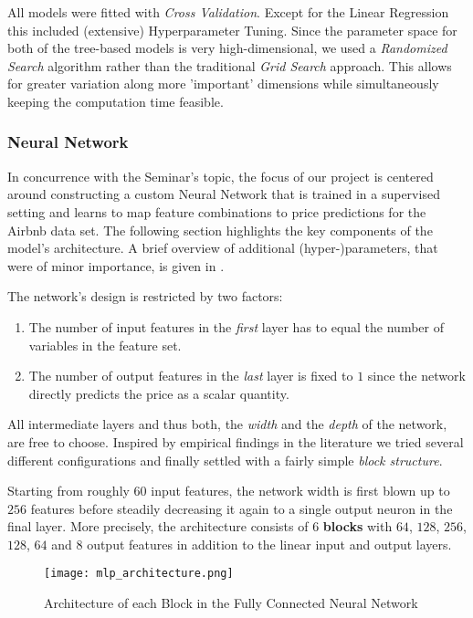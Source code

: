 All models were fitted with \emph{Cross Validation}.
Except for the Linear Regression this included (extensive) Hyperparameter Tuning.
Since the parameter space for both of the tree-based models is very high-dimensional, we used a \emph{Randomized Search} algorithm \citep{bergstra2012} rather than the traditional \emph{Grid Search} approach.
This allows for greater variation along more 'important' dimensions while simultaneously keeping the computation time feasible.


\subsubsection{Neural Network} \label{neural-network}

In concurrence with the Seminar's topic, the focus of our project is centered around constructing a custom Neural Network that is trained in a supervised setting and learns to map feature combinations to price predictions for the Airbnb data set.
The following section highlights the key components of the model's architecture.
A brief overview of additional (hyper-)parameters, that were of minor importance, is given in .

The network's design is restricted by two factors:
\begin{enumerate}
  \item The number of input features in the \emph{first} layer has to equal the number of variables in the feature set.
  \item The number of output features in the \emph{last} layer is fixed to $1$ since the network directly predicts the price as a scalar quantity.
\end{enumerate}
All intermediate layers and thus both, the \emph{width} and the \emph{depth} of the network, are free to choose.
Inspired by empirical findings in the literature we tried several different configurations and finally settled with a fairly simple \emph{block structure}.

Starting from roughly $60$ input features, the network width is first blown up to $256$ features before steadily decreasing it again to a single output neuron in the final layer.
More precisely, the architecture consists of $6$ \textbf{blocks} with $64$, $128$, $256$, $128$, $64$ and $8$ output features in addition to the linear input and output layers.

\begin{figure}[t]
  \centering
  \texttt{[image: mlp\_architecture.png]}
  \caption{Architecture of each Block in the Fully Connected Neural Network}
  \label{fig:linear-block}
\end{figure}

